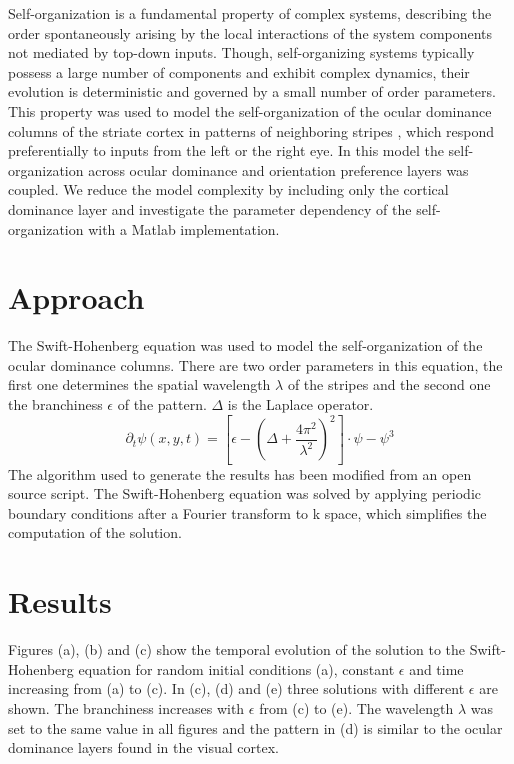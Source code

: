 \documentclass[twocolumn]{bmcart}%
\begin{document}
Self-organization is a fundamental property of complex systems,
describing the order spontaneously arising by the local interactions of
the system components not mediated by top-down inputs. Though,
self-organizing systems typically possess a large number of components
and exhibit complex dynamics, their evolution is deterministic and
governed by a small number of order parameters. This property was used
to model the self-organization of the ocular dominance columns of
the striate cortex in patterns of neighboring stripes \cite{Reichl2012}, 
which respond preferentially to inputs from the left or the right eye. 
In this model the self-organization across ocular dominance and 
orientation preference layers was coupled. We reduce the model complexity 
by including only the cortical dominance layer and investigate the 
parameter dependency of the self-organization with a Matlab implementation. 

\section{Approach}\label{approach}

The Swift-Hohenberg equation \cite{Hohenberg1992} was used to model the 
self-organization of the ocular dominance columns. There are two order 
parameters in this equation, the first one determines the spatial wavelength 
\(\lambda\) of the stripes and the second one the branchiness \(\epsilon\) 
of the pattern. $\Delta$ is the Laplace operator.
\begin{equation}
\partial_{t}\psi{(x,y,t)}= [\epsilon-(\Delta+\frac{4\pi^2}{\lambda^2})^2]\cdot\psi - \psi^3
\end{equation}
The algorithm used to generate the results has been modified
from an open source script. The Swift-Hohenberg equation was solved by 
applying periodic boundary conditions after a Fourier transform to k space, 
which simplifies the computation of the solution.

\section{Results}\label{results}

Figures (a), (b) and (c) show the temporal evolution of the solution to
the Swift-Hohenberg equation for random initial conditions (a), constant
\(\epsilon\) and time increasing from (a) to (c). In (c), (d) and (e)
three solutions with different \(\epsilon\) are shown. The branchiness
increases with \(\epsilon\) from (c) to (e). The wavelength \(\lambda\)
was set to the same value in all figures and the pattern in (d) is
similar to the ocular dominance layers found in the visual cortex.
\end{document}
